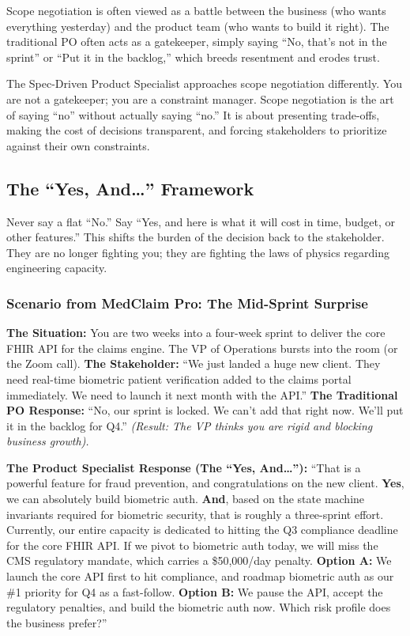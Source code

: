 \documentclass[
  11pt,
  openany,
  oneside]{book}
\begin{document}
Scope negotiation is often viewed as a battle between the business (who
wants everything yesterday) and the product team (who wants to build it
right). The traditional PO often acts as a gatekeeper, simply saying
``No, that's not in the sprint'' or ``Put it in the backlog,'' which
breeds resentment and erodes trust.

The Spec-Driven Product Specialist approaches scope negotiation
differently. You are not a gatekeeper; you are a constraint manager.
Scope negotiation is the art of saying ``no'' without actually saying
``no.'' It is about presenting trade-offs, making the cost of decisions
transparent, and forcing stakeholders to prioritize against their own
constraints.

\subsection{\texorpdfstring{The ``Yes, And\ldots{}''
Framework}{The ``Yes, And\ldots'' Framework}}\label{the-yes-and-framework}

Never say a flat ``No.'' Say ``Yes, and here is what it will cost in
time, budget, or other features.'' This shifts the burden of the
decision back to the stakeholder. They are no longer fighting you; they
are fighting the laws of physics regarding engineering capacity.

\subsubsection{Scenario from MedClaim Pro: The Mid-Sprint
Surprise}\label{scenario-from-medclaim-pro-the-mid-sprint-surprise}

\textbf{The Situation:} You are two weeks into a four-week sprint to
deliver the core FHIR API for the claims engine. The VP of Operations
bursts into the room (or the Zoom call). \textbf{The Stakeholder:} ``We
just landed a huge new client. They need real-time biometric patient
verification added to the claims portal immediately. We need to launch
it next month with the API.'' \textbf{The Traditional PO Response:}
``No, our sprint is locked. We can't add that right now. We'll put it in
the backlog for Q4.'' \emph{(Result: The VP thinks you are rigid and
blocking business growth).}

\textbf{The Product Specialist Response (The ``Yes, And\ldots{}''):}
``That is a powerful feature for fraud prevention, and congratulations
on the new client. \textbf{Yes}, we can absolutely build biometric auth.
\textbf{And}, based on the state machine invariants required for
biometric security, that is roughly a three-sprint effort. Currently,
our entire capacity is dedicated to hitting the Q3 compliance deadline
for the core FHIR API. If we pivot to biometric auth today, we will miss
the CMS regulatory mandate, which carries a \$50,000/day penalty.
\textbf{Option A:} We launch the core API first to hit compliance, and
roadmap biometric auth as our \#1 priority for Q4 as a fast-follow.
\textbf{Option B:} We pause the API, accept the regulatory penalties,
and build the biometric auth now. Which risk profile does the business
prefer?''
\end{document}
